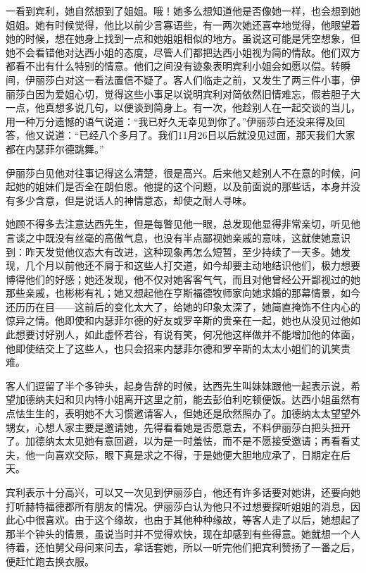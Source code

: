 \par 一看到宾利，她自然想到了姐姐。哦！她多么想知道他是否像她一样，也会想到她姐姐。她有时候觉得，他比以前少言寡语些，有一两次她还喜幸地觉得，他眼望着她的时候，想在她身上找到一点和她姐姐相似的地方。虽说这可能是凭空想象，但她不会看错他对达西小姐的态度，尽管人们都把达西小姐视为简的情敌。他们双方都看不出有什么特别的情意。他们之间没有迹象表明宾利小姐会如愿以偿。转瞬间，伊丽莎白对这一看法置信不疑了。客人们临走之前，又发生了两三件小事，伊丽莎白因为爱姐心切，觉得这些小事足以说明宾利对简依然旧情难忘，假若胆子大一点，他真想多说几句，以便谈到简身上。有一次，他趁别人在一起交谈的当儿，用一种万分遗憾的语气说道：“我已好久无幸见到你了。”伊丽莎白还没来得及回答，他又说道：“已经八个多月了。我们11月26日以后就没见过面，那天我们大家都在内瑟菲尔德跳舞。”
\par 伊丽莎白见他对往事记得这么清楚，很是高兴。后来他又趁别人不在意的时候，问起她的姐妹们是否全在朗伯恩。他提的这个问题，以及前面说的那些话，本身并没有多少含意，但是说话人的神情意态，却使之耐人寻味。
\par 她顾不得多去注意达西先生，但是每瞥见他一眼，总发现他显得非常亲切，听见他言谈之中既没有丝毫的高傲气息，也没有半点鄙视她亲戚的意味，这就使她意识到：昨天发觉他仪态大有改进，这种现象再怎么短暂，至少持续了一天多。她发现，几个月以前他还不屑于和这些人打交道，如今却要主动地结识他们，极力想要博得他们的好感；她还发现，他不仅对她客客气气，而且对他曾经公开鄙视过的她那些亲戚，也彬彬有礼；她又想起他在亨斯福德牧师家向她求婚的那幕情景，如今还历历在目——这前后的变化太大了，给她的印象太深了，她简直掩饰不住内心的惊异之情。他即使和内瑟菲尔德的好友或罗辛斯的贵亲在一起，她也从没见过他如此想要讨好别人，如此虚怀若谷，有说有笑，何况他这样做并不能增加他的体面，他即使结交上了这些人，也只会招来内瑟菲尔德和罗辛斯的太太小姐们的讥笑责难。
\par 客人们逗留了半个多钟头，起身告辞的时候，达西先生叫妹妹跟他一起表示说，希望加德纳夫妇和贝内特小姐离开这里之前，能去彭伯利吃顿便饭。达西小姐虽然有点怯生生的，表明她不大习惯邀请客人，但她还是欣然照办了。加德纳太太望望外甥女，心想人家主要是邀请她，先得看看她是否愿意去，不料伊丽莎白把头扭开了。加德纳太太见她有意回避，以为是一时羞怯，而不是不愿接受邀请；再看看丈夫，他一向喜欢交际，眼下真是求之不得，于是她便大胆地应承了，日期定在后天。
\par 宾利表示十分高兴，可以又一次见到伊丽莎白，他还有许多话要对她讲，还要向她打听赫特福德郡所有朋友的情况。伊丽莎白认为他只不过想要探听姐姐的消息，因此心中很喜欢。由于这个缘故，也由于其他种种缘故，等客人走了以后，她想起了那半个钟头的情景，虽说当时并不觉得欢快，现在却感到有些得意。她就想一个人待着，还怕舅父母问来问去，拿话套她，所以一听完他们把宾利赞扬了一番之后，便赶忙跑去换衣服。
